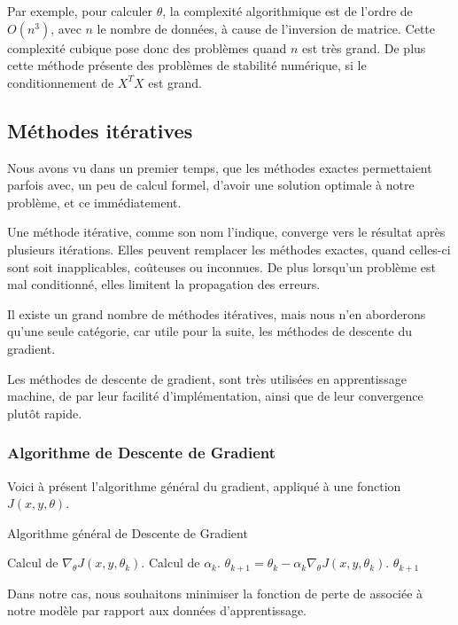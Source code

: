 \documentclass[a4paper, 11pt]{report}
\begin{document}
Par exemple, pour calculer $\theta$, la complexité algorithmique est de l'ordre de $O(n^3)$, avec $n$ le nombre de données, à cause de l'inversion de matrice.
Cette complexité cubique pose donc des problèmes quand $n$ est très grand.
De plus cette méthode présente des problèmes de stabilité numérique, si le conditionnement de $X^TX$ est grand.
		
\subsection{Méthodes itératives}
Nous avons vu dans un premier temps, que les méthodes exactes permettaient parfois avec, un peu de calcul formel, d'avoir une solution optimale à notre problème, et ce immédiatement.

Une méthode itérative, comme son nom l'indique, converge vers le résultat après plusieurs itérations.
Elles peuvent remplacer les méthodes exactes, quand celles-ci sont soit inapplicables, coûteuses ou inconnues. De plus lorsqu'un problème est mal conditionné, elles limitent la propagation des erreurs.

Il existe un grand nombre de méthodes itératives, mais nous n'en aborderons qu'une seule catégorie, car utile pour la suite, les méthodes de descente du gradient.

Les méthodes de descente de gradient, sont très utilisées en apprentissage machine, de par leur facilité d'implémentation, ainsi que de leur convergence plutôt rapide.
\subsubsection{Algorithme de Descente de Gradient}
Voici à présent l'algorithme général du gradient, appliqué à une fonction $J(x,y,\theta)$.
\begin{algorithm}[H]
	\caption{Algorithme général de Descente de Gradient}
	\begin{algorithmic}
		\REPEAT
		\STATE Calcul de $\nabla_\theta J(x,y,\theta_k)$.
		\STATE Calcul de $\alpha_k$.
		\STATE $\theta_{k+1} = \theta_k - \alpha_k \nabla_\theta J(x,y,\theta_k)$.
		\RETURN $\theta_{k+1}$
	\end{algorithmic}
\end{algorithm}
Dans notre cas, nous souhaitons minimiser la fonction de perte de associée à notre modèle par rapport aux données d'apprentissage.
\end{document}

